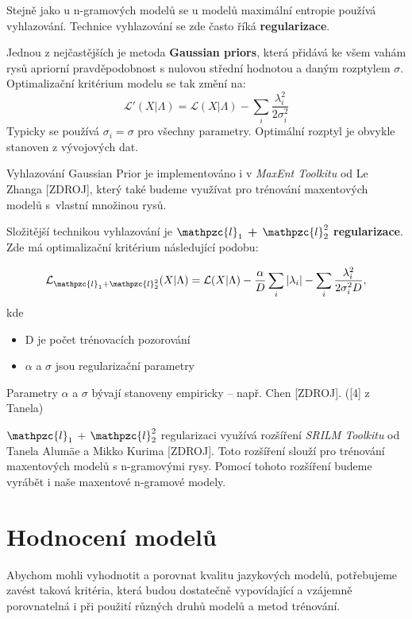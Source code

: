 \documentclass[12pt,a4paper]{report}
\begin{document}
Stejně jako u n-gramových modelů se u modelů maximální entropie používá vyhlazování. Technice vyhlazování se zde často říká \textbf{regularizace}. 

Jednou z nejčastějších je metoda \textbf{Gaussian priors}, která přidává ke všem vahám rysů apriorní pravděpodobnost s nulovou střední hodnotou a daným rozptylem $\sigma$. Optimalizační kritérium modelu se tak změní na:
\begin{equation}
\mathcal{L}'(X|\Lambda) = \mathcal{L}(X|\Lambda) - \sum_i \frac{\lambda_i^2}{2\sigma_i^2}
\end{equation}
Typicky se používá $\sigma_i = \sigma$ pro všechny parametry. Optimální rozptyl je obvykle stanoven z vývojových dat.

Vyhlazování Gaussian Prior je implementováno i v \textit{MaxEnt Toolkitu} od Le Zhanga [ZDROJ], který také budeme využívat pro trénování maxentových modelů s~vlastní množinou rysů.

Složitější technikou vyhlazování je \textbf{$\mathpzc{l}_1$ + $\mathpzc{l}_2^2$ regularizace}. Zde má optimalizační kritérium následující podobu:

\begin{equation}
\mathcal{L}_{\mathpzc{l}_1 + \mathpzc{l}_2^2} (X|\Lambda) = \mathcal{L}(X|\Lambda) - \frac{\alpha}{D} \sum_i |\lambda_i| - \sum_i \frac{\lambda_i^2}{2\sigma_i^2 D},
\end{equation}
kde \begin{itemize}
\item{D je počet trénovacích pozorování}
\item{$\alpha$ a $\sigma$ jsou regularizační parametry}
\end{itemize}

Parametry $\alpha$ a $\sigma$ bývají stanoveny empiricky -- např. Chen [ZDROJ]. ([4] z Tanela)

$\mathpzc{l}_1$ + $\mathpzc{l}_2^2$ regularizaci využívá rozšíření \textit{SRILM Toolkitu} od Tanela Alumäe a Mikko Kurima [ZDROJ]. Toto rozšíření slouží pro trénování maxentových modelů s n-gramovými rysy. Pomocí tohoto rozšíření budeme vyrábět i naše maxentové n-gramové modely.

\section{Hodnocení modelů}
Abychom mohli vyhodnotit a porovnat kvalitu jazykových modelů, potřebujeme zavést taková kritéria, která budou dostatečně vypovídající a vzájemně porovnatelná i při použití různých druhů modelů a metod trénování.
\end{document}
